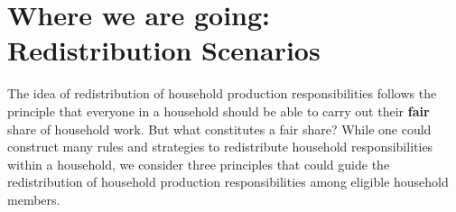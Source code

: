 \documentclass[
  11pt,
]{article}
\begin{document}
\begin{table}

\caption{\label{tbl-stat}Summary Statistics Population}


\end{table}%

\section{Where we are going: Redistribution
Scenarios}\label{where-we-are-going-redistribution-scenarios}

The idea of redistribution of household production responsibilities
follows the principle that everyone in a household should be able to
carry out their \textbf{fair} share of household work. But what
constitutes a fair share? While one could construct many rules and
strategies to redistribute household responsibilities within a
household, we consider three principles that could guide the
redistribution of household production responsibilities among eligible
household members.
\end{document}
